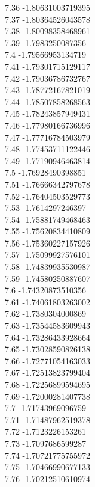 {7.36	-1.80631003719395\\
7.37	-1.80364526043578\\
7.38	-1.80098358468961\\
7.39	-1.7983250087356\\
7.4	-1.79566953134719\\
7.41	-1.79301715129117\\
7.42	-1.79036786732767\\
7.43	-1.78772167821019\\
7.44	-1.78507858268563\\
7.45	-1.78243857949431\\
7.46	-1.77980166736996\\
7.47	-1.77716784503979\\
7.48	-1.77453711122446\\
7.49	-1.77190946463814\\
7.5	-1.76928490398851\\
7.51	-1.76666342797678\\
7.52	-1.76404503529773\\
7.53	-1.7614297246397\\
7.54	-1.75881749468463\\
7.55	-1.75620834410809\\
7.56	-1.75360227157926\\
7.57	-1.75099927576101\\
7.58	-1.74839935530987\\
7.59	-1.74580250887607\\
7.6	-1.74320873510356\\
7.61	-1.74061803263002\\
7.62	-1.7380304000869\\
7.63	-1.73544583609943\\
7.64	-1.73286433928664\\
7.65	-1.73028590826138\\
7.66	-1.72771054163033\\
7.67	-1.72513823799404\\
7.68	-1.72256899594695\\
7.69	-1.72000281407738\\
7.7	-1.71743969096759\\
7.71	-1.71487962519378\\
7.72	-1.7123226153261\\
7.73	-1.7097686599287\\
7.74	-1.70721775755972\\
7.75	-1.70466990677133\\
7.76	-1.70212510610974\\
}
